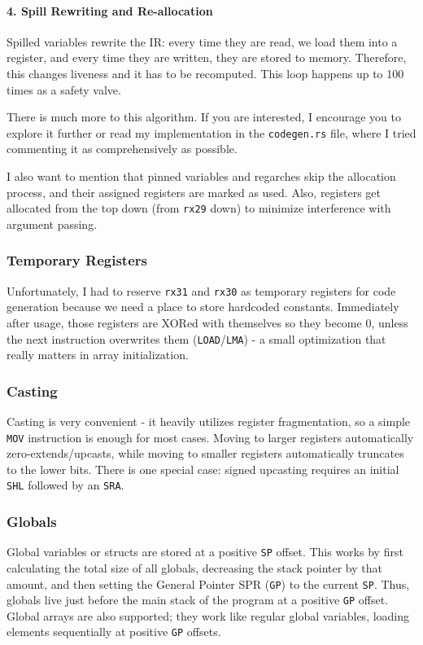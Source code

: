 \documentclass{article}
\begin{document}
\paragraph{4. Spill Rewriting and Re-allocation}
Spilled variables rewrite the IR: every time they are read, we load them into a register, and every time they are written, they are stored to memory. Therefore, this changes liveness and it has to be recomputed. This loop happens up to 100 times as a safety valve. 

There is much more to this algorithm. If you are interested, I encourage you to explore it further or read my implementation in the \texttt{codegen.rs} file, where I tried commenting it as comprehensively as possible.

I also want to mention that pinned variables and regarches skip the allocation process, and their assigned registers are marked as used. Also, registers get allocated from the top down (from \texttt{rx29} down) to minimize interference with argument passing.

\subsubsection{Temporary Registers}
Unfortunately, I had to reserve \texttt{rx31} and \texttt{rx30} as temporary registers for code generation because we need a place to store hardcoded constants. Immediately after usage, those registers are XORed with themselves so they become 0, unless the next instruction overwrites them (\texttt{LOAD}/\texttt{LMA}) - a small optimization that really matters in array initialization. 

\subsubsection{Casting}
Casting is very convenient - it heavily utilizes register fragmentation, so a simple \texttt{MOV} instruction is enough for most cases. Moving to larger registers automatically zero-extends/upcasts, while moving to smaller registers automatically truncates to the lower bits. There is one special case: signed upcasting requires an initial \texttt{SHL} followed by an \texttt{SRA}. 

\subsubsection{Globals}
Global variables or structs are stored at a positive \texttt{SP} offset. This works by first calculating the total size of all globals, decreasing the stack pointer by that amount, and then setting the General Pointer SPR (\texttt{GP}) to the current \texttt{SP}. Thus, globals live just before the main stack of the program at a positive \texttt{GP} offset. Global arrays are also supported; they work like regular global variables, loading elements sequentially at positive \texttt{GP} offsets. 
\end{document}

